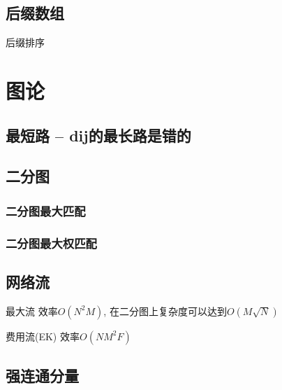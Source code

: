 \documentclass[UTF8]{article}
\newcommand{\cppcode}[1]{
    
}
\begin{document}
\subsection{后缀数组}
后缀排序
\cppcode{SA.cpp}

\newpage

\section{图论}

\subsection{最短路 -- dij的最长路是错的}
\cppcode{dijkstra.cpp}

\subsection{二分图}

\subsubsection{二分图最大匹配}
\cppcode{hunery.cpp}

\subsubsection{二分图最大权匹配}
\cppcode{KM.cpp}

\subsection{网络流}
最大流
效率$O(N^2M)$, 在二分图上复杂度可以达到$O(M\sqrt N)$
\cppcode{dinic.cpp}

费用流(EK)
效率$O(NM^2F)$
\cppcode{EK.cpp}

\subsection{强连通分量}
\cppcode{SCC.cpp}
\end{document}
